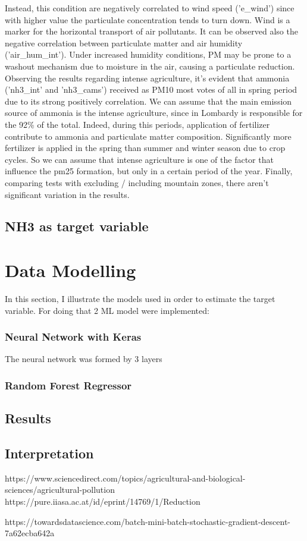 Instead, this condition are negatively correlated to wind speed ('e\_wind') since with higher value the particulate concentration tends to turn down. Wind is a marker for the horizontal transport of air pollutants.
It can be observed also the negative correlation between particulate matter and air humidity ('air\_hum\_int').
Under increased humidity conditions, PM may be prone to a washout mechanism due to moisture in the air, causing a particulate reduction\cite{biglari2017relationship}.
Observing the results regarding intense agriculture, it's evident that ammonia ('nh3\_int' and 'nh3\_cams') received as PM10 most votes of all in spring period due to its strong positively correlation. 
We can assume that the main emission source of ammonia is the intense agriculture, since in Lombardy is responsible for the 92\%  of the total\cite{maranzano2022air}.
Indeed, during this periods, application of fertilizer contribute to ammonia and particulate matter composition.
Significantly more fertilizer is applied in the spring than summer and winter season due to crop cycles.
So we can assume that intense agriculture is one of the factor that influence the pm25 formation, but only in a certain period of the year.
Finally, comparing tests with excluding / including mountain zones, there aren't significant variation in the results.
\subsection{NH3 as target variable}




\section{Data Modelling}
In this section, I illustrate the models used in order to estimate the target variable. For doing that 2 ML model were implemented:

\subsubsection{Neural Network with Keras}
The neural network was formed by 3 layers
\subsubsection{Random Forest Regressor}

\subsection{Results}
\subsection{Interpretation}

https://www.sciencedirect.com/topics/agricultural-and-biological-sciences/agricultural-pollution 
https://pure.iiasa.ac.at/id/eprint/14769/1/Reduction%

https://towardsdatascience.com/batch-mini-batch-stochastic-gradient-descent-7a62ecba642a